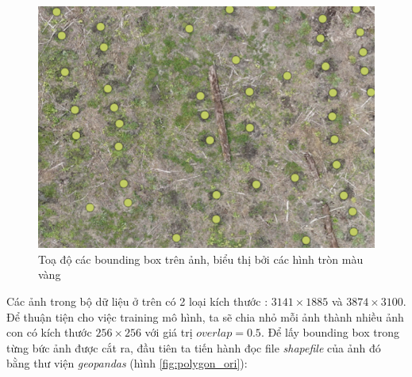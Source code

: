 \documentclass[a4paper, 12pt]{report}
\begin{document}
\begin{enumerate}[label= \textit{\alph*)}]
 \begin{figure}[!htb]
	\centering
	\includegraphics[width=0.7\linewidth]{Images/qgisb}
	\caption{Toạ độ các bounding box trên ảnh,  biểu thị bởi các hình tròn màu vàng}
	\label{fig:1b}
\end{figure}



%
\newpage
Các ảnh trong bộ dữ liệu ở trên có 2 loại kích thước : $3141 \times 1885$ và $3874 \times 3100$.  Để thuận tiện cho việc training mô hình,  ta sẽ chia nhỏ mỗi ảnh thành nhiều ảnh con có kích thước $256 \times 256$ với giá trị $overlap = 0.5$.  Để lấy bounding box trong từng bức ảnh được cắt ra,  đầu tiên ta tiến hành đọc file \textit{shapefile} của ảnh đó bằng thư viện \textit{geopandas} (hình \ref{fig:polygon_ori}): 


\end{enumerate}
\end{document}
